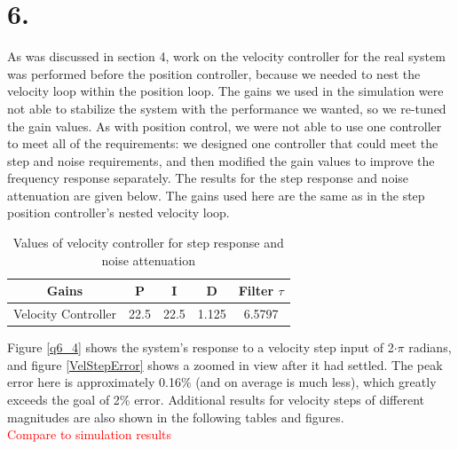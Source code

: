 \documentclass{article}
\newcommand{\xxx}[1]{\textcolor{red}{#1}}
\theoremstyle{plain}
\theoremstyle{definition}
\theoremstyle{remark}
\begin{document}
\section*{6.}
As was discussed in section 4, work on the velocity controller for the real system was performed before the position controller, because we needed to nest the velocity loop within the position loop. The gains we used in the simulation were not able to stabilize the system with the performance we wanted, so we re-tuned the gain values. As with position control, we were not able to use one controller to meet all of the requirements: we designed one controller that could meet the step and noise requirements, and then modified the gain values to improve the frequency response separately. The results for the step response and noise attenuation are given below. The gains used here are the same as in the step position controller's nested velocity loop.\\

\begin{table}[htb]
\begin{center}
    \begin{tabular}{|c|c|c|c|c|}
        \hline
        Gains & P   & I & D     & Filter $\tau$   \\ \hline
        Velocity Controller       & 22.5   & 22.5    & 1.125    & 6.5797  \\ 
       \hline
    \end{tabular}
\end{center}
\caption{Values of velocity controller for step response and noise attenuation}
\label{velocityGains}
\end{table}

Figure \ref{q6_4} shows the system's response to a velocity step input of 2$\cdot\pi$ radians, and figure \ref{VelStepError} shows a zoomed in view after it had settled. The peak error here is approximately 0.16\% (and on average is much less), which greatly exceeds the goal of 2\% error. Additional results for velocity steps of different magnitudes are also shown in the following tables and figures.\\

\xxx{Compare to simulation results}
\end{document}
